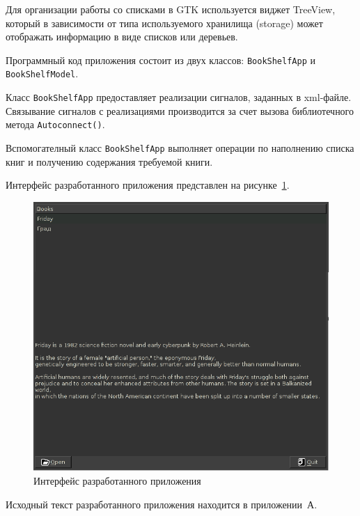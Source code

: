 Для организации работы со списками в GTK используется виджет TreeView,
который в зависимости от типа используемого хранилища (storage) может
отображать информацию в виде списков или деревьев.

Программный код приложения состоит из двух классов: \texttt{BookShelfApp} и
\texttt{BookShelfModel}.

Класс \texttt{BookShelfApp} предоставляет реализации сигналов, 
заданных в xml-файле. Связывание сигналов с реализациями производится 
за счет вызова библиотечного метода \texttt{Autoconnect()}.

Вспомогателный класс \texttt{BookShelfApp} выполняет операции по наполнению
списка книг и получению содержания требуемой книги.

Интерфейс разработанного приложения представлен на рисунке~\ref{pic:interface}.

\begin{figure}[h!]
  \centering
  \includegraphics[width=150mm]{pic/interface}
  \caption{Интерфейс разработанного приложения}
  \label{pic:interface}
\end{figure}

Исходный текст разработанного приложения находится в приложении~А.